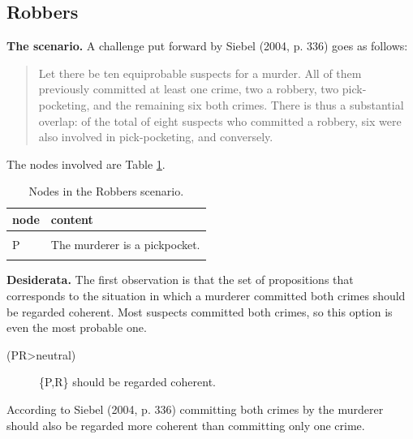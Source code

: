 \documentclass[
  10pt,
]{scrartcl}
\newcommand{\s}[1]{\textsf{#1}}
\begin{document}
\hypertarget{robbers}{%
\subsection{Robbers}\label{robbers}}

\textbf{The scenario.} A challenge put forward by Siebel (2004, p. 336) goes as follows:

\begin{quote}
    Let there be ten equiprobable suspects for a murder. All of them previously committed at least one crime, two a robbery, two pick-pocketing, and the remaining six both crimes. There is thus a substantial overlap: of the total of eight suspects who committed a robbery, six were also involved in pick-pocketing, and conversely. 
\end{quote}

\noindent The nodes involved are Table \ref{tab:robbersPropositions}.

\begin{table}[H]

\caption{\label{tab:robbersPropositions}Nodes in the Robbers scenario.}
\centering
\begin{tabular}[t]{ll}
\toprule
node & content\\
\midrule
\cellcolor{gray!6}{W} & \cellcolor{gray!6}{Real perpetrator status (states: OnlyP, OnlyR, Both).}\\
P & The murderer is a pickpocket.\\
\cellcolor{gray!6}{R} & \cellcolor{gray!6}{The murderer is a robber.}\\
\bottomrule
\end{tabular}
\end{table}

\noindent  \textbf{Desiderata.} The first observation is that the set of propositions that corresponds to the situation in which a murderer committed both crimes should be regarded coherent. Most suspects committed both crimes, so this option is even the most probable one.
\vspace{2mm}

\begin{description}
    \item[(\s{PR}\textgreater \s{neutral})] \{\s{P,R}\} should be regarded coherent. 
\end{description}\vspace{2mm}

According to Siebel (2004, p. 336) committing both crimes by the murderer should also be regarded more coherent than committing only one crime.
\vspace{2mm}
\end{document}
